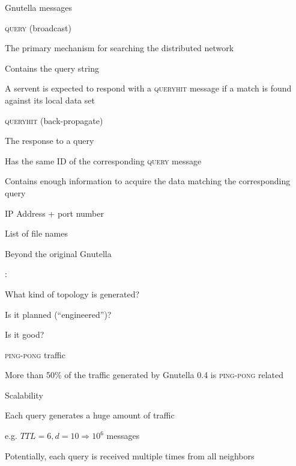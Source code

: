 \begin{frame}{Gnutella messages}

\BIL
\item \alert{\textsc{query}} (broadcast)
	\BI
	\item The primary mechanism for searching the distributed network
	\item Contains the query string
	\item A servent is expected to respond with a \textsc{queryhit} message if a match is found against its local data set
	\EI
\item \alert{\textsc{queryhit}} (back-propagate)
	\BI
	\item The response to a query
	\item Has the same ID of the corresponding \textsc{query} message
	\item Contains enough information to acquire the data matching the corresponding query
		\BI 
		\item IP Address + port number
		\item List of file names
		\EI
	\EI
\EIL

\end{frame}

\begin{frame}{Beyond the original Gnutella}

:\\
\BIL
\item What kind of topology is generated?
	\BI
	\item Is it planned (“engineered”)?
	\item Is it good?
	\EI
\item \textsc{ping}-\textsc{pong} traffic
	\BI
	\item More than 50\% of the traffic generated by Gnutella 0.4 is \textsc{ping}-\textsc{pong} related
	\EI
\item Scalability
	\BI
	\item Each query generates a huge amount of traffic
	\BI
	\item e.g. $\mathit{TTL}=6, d=10 \Rightarrow 10^6$ messages 
	\EI
	\item Potentially, each query is received multiple times from all neighbors
	\EI
\EIL

\end{frame}


